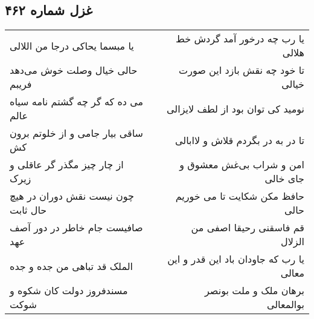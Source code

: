 \begin{center}
\section*{غزل شماره ۴۶۲}
\label{sec:sh462}
\begin{longtable}{l p{0.5cm} r}
یا مبسما یحاکی درجا من اللالی
&&
یا رب چه درخور آمد گردش خط هلالی
\\
حالی خیال وصلت خوش می‌دهد فریبم
&&
تا خود چه نقش بازد این صورت خیالی
\\
می ده که گر چه گشتم نامه سیاه عالم
&&
نومید کی توان بود از لطف لایزالی
\\
ساقی بیار جامی و از خلوتم برون کش
&&
تا در به در بگردم قلاش و لاابالی
\\
از چار چیز مگذر گر عاقلی و زیرک
&&
امن و شراب بی‌غش معشوق و جای خالی
\\
چون نیست نقش دوران در هیچ حال ثابت
&&
حافظ مکن شکایت تا می خوریم حالی
\\
صافیست جام خاطر در دور آصف عهد
&&
قم فاسقنی رحیقا اصفی من الزلال
\\
الملک قد تباهی من جده و جده
&&
یا رب که جاودان باد این قدر و این معالی
\\
مسندفروز دولت کان شکوه و شوکت
&&
برهان ملک و ملت بونصر بوالمعالی
\\
\end{longtable}
\end{center}
